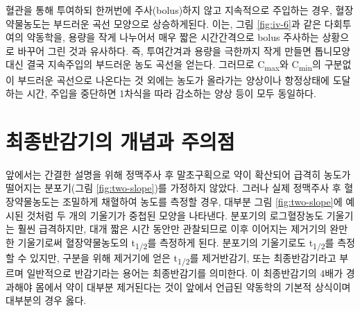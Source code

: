 \documentclass[
  11pt,
  krantz2, a4paper, twoside]{krantz}
\theoremstyle{definition}
\theoremstyle{definition}
\theoremstyle{definition}
\theoremstyle{definition}
\theoremstyle{remark}
\begin{document}
혈관을 통해 투여하되 한꺼번에 주사(bolus)하지 않고 지속적으로 주입하는
경우, 혈장약물농도는 부드러운 곡선 모양으로 상승하게된다. 이는, 그림 \ref{fig:iv-6}과 같은 다회투여의 약동학을, 용량을 작게 나누어서 매우 짧은
시간간격으로 bolus 주사하는 상황으로 바꾸어 그린 것과 유사하다.
즉, 투여간겨과 용량을 극한까지 작게 만들면 톱니모양 대신 결국 지속주입의 부드러운 농도 곡선을 얻는다.
그러므로 C\textsubscript{max}와 C\textsubscript{min}의
구분없이 부드러운 곡선으로 나온다는 것 외에는 농도가 올라가는 양상이나
항정상태에 도달하는 시간, 주입을 중단하면 1차식을 따라 감소하는 양상
등이 모두 동일하다.

\hypertarget{uxcd5cuxc885uxbc18uxac10uxae30uxc758-uxac1cuxb150uxacfc-uxc8fcuxc758uxc810}{%
\section{\texorpdfstring{최종반감기의 개념과 주의점}{최종반감기의 개념과 주의점}}\label{uxcd5cuxc885uxbc18uxac10uxae30uxc758-uxac1cuxb150uxacfc-uxc8fcuxc758uxc810}}

앞에서는 간결한 설명을 위해 정맥주사 후 말초구획으로 약이 확산되어
급격히 농도가 떨어지는 분포기(그림 \ref{fig:two-slope})를 가정하지 않았다. 그러나 실제
정맥주사 후 혈장약물농도는 조밀하게 채혈하여 농도를 측정할 경우, 대부분
그림 \ref{fig:two-slope}에 예시된 것처럼 두 개의 기울기가 중첩된 모양을 나타낸다.
분포기의 로그혈장농도 기울기는 훨씬 급격하지만, 대개 짧은 시간 동안만
관찰되므로 이후 이어지는 제거기의 완만한 기울기로써 혈장약물농도의
t\textsubscript{1/2}를 측정하게 된다. 분포기의 기울기로도 t\textsubscript{1/2}를 측정할 수 있지만,
구분을 위해 제거기에 얻은 t\textsubscript{1/2}를 제거반감기, 또는 최종반감기라고
부르며 일반적으로 반감기라는 용어는 최종반감기를 의미한다. 이
최종반감기의 4배가 경과해야 몸에서 약이 대부분 제거된다는 것이 앞에서
언급된 약동학의 기본적 상식이며 대부분의 경우 옳다.
\end{document}
